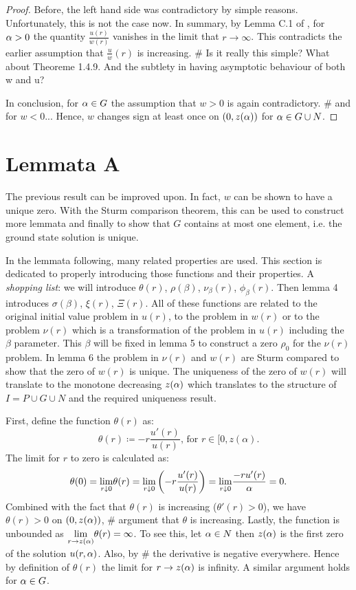 \begin{proof}
Before, the left hand side was contradictory by simple reasons. Unfortunately, this is not the case now. In summary,  by Lemma C.1 of \cite{fthes}, for $\alpha>0$ the quantity $\frac{u(r)}{w(r)}$ vanishes in the limit that $r\to\infty$. This contradicts the earlier assumption that $\frac{u}{w}(r)$ is increasing.
\# Is it really this simple? What about Theoreme 1.4.9. And the subtlety in having asymptotic behaviour of both w and u?

In conclusion, for $\alpha\in G$ the assumption that $w>0$ is again contradictory. \# and for $w<0$... Hence, $w$ changes sign at least once on $(0,z(\alpha))$ for $\alpha\in G\cup N$.
\end{proof}

\section{Lemmata A}
The previous result can be improved upon. In fact, $w$ can be shown to have a unique zero. With the Sturm comparison theorem, this can be used to construct more lemmata and finally to show that $G$ contains at most one element, i.e. the ground state solution is unique.

In the lemmata following, many related properties are used. This section is dedicated to properly introducing those functions and their properties. A \emph{shopping list}: we will introduce $\theta(r)$, $\rho(\beta)$, $\nu_\beta(r)$, $\phi_\beta(r)$. Then lemma 4 introduces $\sigma(\beta)$, $\xi(r)$, $\Xi(r)$. All of these functions are related to the original initial value problem in $u(r)$, to the problem in $w(r)$ or to the problem $\nu(r)$ which is a transformation of the problem in $u(r)$ including the $\beta$ parameter. This $\beta$ will be fixed in lemma 5 to construct a zero $\rho_0$ for the $\nu(r)$ problem. In lemma 6 the problem in $\nu(r)$ and $w(r)$ are Sturm compared to show that the zero of $w(r)$ is unique. The uniqueness of the zero of $w(r)$ will translate to the monotone decreasing $z(\alpha)$ which translates to the structure of $I=P\cup G\cup N$ and the required uniqueness result.

First, define the function $\theta(r)$ as: 
$$\theta(r)\coloneqq-r\frac{u'(r)}{u(r)}\text{, for }r\in[0,z(\alpha).$$ 
The limit for $r$ to zero is calculated as: 
$$\theta(0)=\underset{r\downarrow0}{\lim}\theta(r)=\underset{r\downarrow0}{\lim}\left(-r\frac{u'(r)}{u(r)}\right)=\underset{r\downarrow0}{\lim}\frac{-ru'(r)}{\alpha}=0.$$ 
Combined with the fact that $\theta(r)$ is increasing ($\theta'(r)>0$), we have $\theta(r)>0$ on $(0,z(\alpha))$, \# argument that $\theta$ is increasing. 
Lastly, the function is unbounded as $\underset{r\to z(\alpha)}{\lim}\theta(r)=\infty$. To see this, let $\alpha\in N$ then $z(\alpha)$ is the first zero of the solution $u(r,\alpha)$. Also, by \# the derivative is negative everywhere. Hence by definition of $\theta(r)$ the limit for $r\to z(\alpha)$ is infinity. A similar argument holds for $\alpha\in G$.

